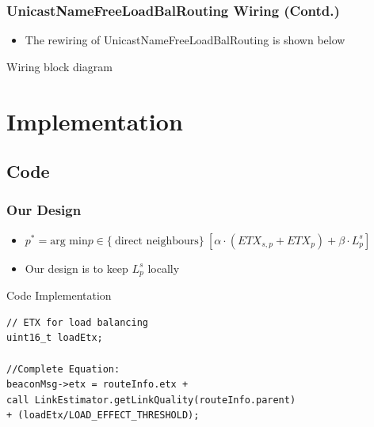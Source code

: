 \documentclass{beamer}
\begin{document}
\begin{frame}[fragile]
  \frametitle{UnicastNameFreeLoadBalRouting Wiring (Contd.)}
  
    \begin{itemize}
      \item The rewiring of UnicastNameFreeLoadBalRouting is shown below
    \end{itemize}

  \footnotesize{
    \begin{block}{Wiring block diagram}
    \end{block}
  }
\end{frame}





\section{Implementation}
\subsection{Code}

\begin{frame}[fragile]
  \frametitle{Our Design}
  \begin{itemize}
    \item $p^* = \text{arg min}  p \in \{\ \text{direct neighbours} \}\
                 [\alpha  \cdot (ETX_{s,p} + ETX_p) + \beta \cdot L_p^s]$

    \item Our design is to keep $L_p^s$ locally
  \end{itemize} 
   
  \footnotesize{
  \begin{block}{Code Implementation}
    \begin{verbatim}
// ETX for load balancing                                                                                                                                                              
uint16_t loadEtx;

//Complete Equation:
beaconMsg->etx = routeInfo.etx + 
call LinkEstimator.getLinkQuality(routeInfo.parent) 
+ (loadEtx/LOAD_EFFECT_THRESHOLD);
    \end{verbatim}
  \end{block}
}
\end{frame}
\end{document}
